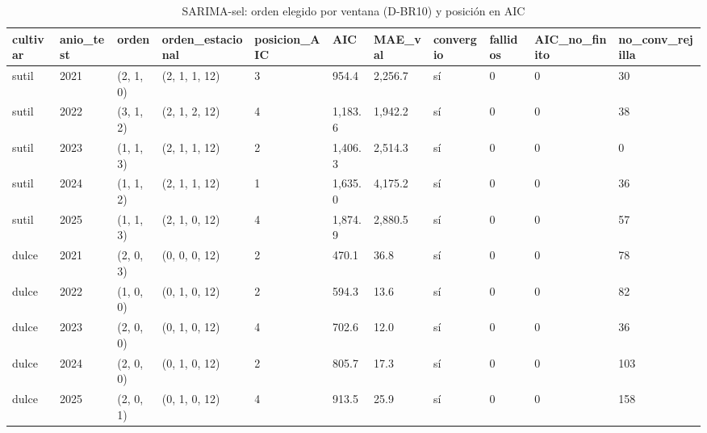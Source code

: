 \begin{table}[H]
\centering
\small
\caption{SARIMA-sel: orden elegido por ventana (D-BR10) y posición en AIC}
\label{tab:T20_sarima_sel}
\begin{tabular}{lllllllllll}
\toprule
cultivar & anio\_test & orden & orden\_estacional & posicion\_AIC & AIC & MAE\_val & convergio & fallidos & AIC\_no\_finito & no\_conv\_rejilla \\
\midrule
sutil & 2021 & (2, 1, 0) & (2, 1, 1, 12) & 3 & 954.4 & 2,256.7 & sí & 0 & 0 & 30 \\
sutil & 2022 & (3, 1, 2) & (2, 1, 2, 12) & 4 & 1,183.6 & 1,942.2 & sí & 0 & 0 & 38 \\
sutil & 2023 & (1, 1, 3) & (2, 1, 1, 12) & 2 & 1,406.3 & 2,514.3 & sí & 0 & 0 & 0 \\
sutil & 2024 & (1, 1, 2) & (2, 1, 1, 12) & 1 & 1,635.0 & 4,175.2 & sí & 0 & 0 & 36 \\
sutil & 2025 & (1, 1, 3) & (2, 1, 0, 12) & 4 & 1,874.9 & 2,880.5 & sí & 0 & 0 & 57 \\
dulce & 2021 & (2, 0, 3) & (0, 0, 0, 12) & 2 & 470.1 & 36.8 & sí & 0 & 0 & 78 \\
dulce & 2022 & (1, 0, 0) & (0, 1, 0, 12) & 2 & 594.3 & 13.6 & sí & 0 & 0 & 82 \\
dulce & 2023 & (2, 0, 0) & (0, 1, 0, 12) & 4 & 702.6 & 12.0 & sí & 0 & 0 & 36 \\
dulce & 2024 & (2, 0, 0) & (0, 1, 0, 12) & 2 & 805.7 & 17.3 & sí & 0 & 0 & 103 \\
dulce & 2025 & (2, 0, 1) & (0, 1, 0, 12) & 4 & 913.5 & 25.9 & sí & 0 & 0 & 158 \\
\bottomrule
\end{tabular}
\end{table}